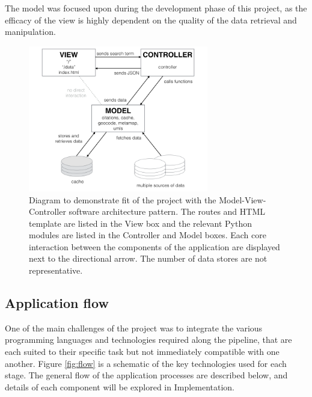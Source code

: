 \documentclass[Report.tex]{subfiles}
\begin{document}
\noindent The model was focused upon during the development phase of this project, as the efficacy of the view is highly dependent on the quality of the data retrieval and manipulation.\newline

\begin{figure}[!ht]
\begin{center}
	\includegraphics[width=0.7\textwidth]{../lib/images/mvc.png}
	\caption{Diagram to demonstrate fit of the project with the Model-View-Controller software architecture pattern. The routes and HTML template are listed in the View box and the relevant Python modules are listed in the Controller and Model boxes. Each core interaction between the components of the application are displayed next to the directional arrow. The number of data stores are not representative.}
\label{fig:mvc}
\end{center}
\end{figure}
\hfill
\newpage

\subsection{Application flow}
One of the main challenges of the project was to integrate the various programming languages and technologies required along the pipeline, that are each suited to their specific task but not immediately compatible with one another. Figure \ref{fig:flow} is a schematic of the key technologies used for each stage. The general flow of the application processes are described below, and details of each component will be explored in Implementation.
\end{document}
